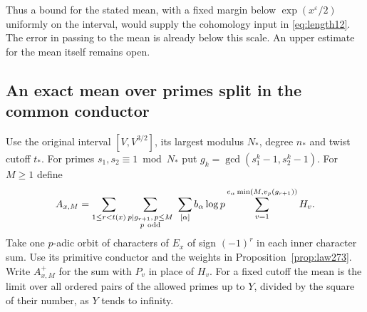 \documentclass[a4paper,11pt]{article}
\theoremstyle{definition}
\theoremstyle{remark}
\numberwithin{equation}{section}
\begin{document}
Thus a bound for the stated mean, with a fixed margin below
\(\exp(x^\varepsilon/2)\) uniformly on the interval, would
supply the cohomology input in \eqref{eq:length12}. The
error in passing to the mean is already below this scale.
An upper estimate for the mean itself remains open.

\subsection{An exact mean over primes split in the common conductor}\label{nav:I-61}
Use the original interval \([V,V^{3/2}]\), its largest modulus
\(N_*\), degree \(n_*\) and twist cutoff \(t_*\).
For primes \(s_1,s_2\equiv1\bmod N_*\) put
\(g_k=\gcd(s_1^k-1,s_2^k-1)\). For \(M\ge1\) define
\[
  A_{x,M}=\sum_{1\le r<t(x)}
   \sum_{\substack{p\mid g_{r+1},\,p\le M\\p\ {\rm odd}}}
    \ \sum_{[\alpha]} b_\alpha\log p
    \sum_{v=1}^{e_\alpha\min(M,v_p(g_{r+1}))} H_v .
\]
Take one \(p\)-adic orbit of characters of \(E_x\) of sign
\((-1)^r\) in each inner character sum. Use its primitive
conductor and the weights in Proposition~\ref{prop:law273}.
Write \(A^+_{x,M}\) for the sum with \(P_v\) in place of \(H_v\).
For a fixed cutoff the mean is the limit over all ordered pairs
of the allowed primes up to \(Y\), divided by the square of their
number, as \(Y\) tends to infinity.
\end{document}
